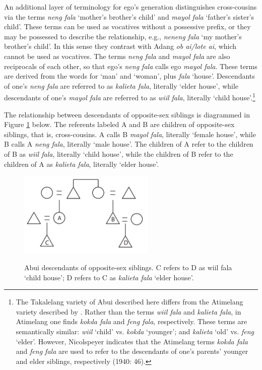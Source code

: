 An additional layer of terminology for ego's generation distinguishes cross-cousins via the terms \textit{neng fala} `mother's brother's child' and \textit{mayol fala} `father's sister's child'. These terms can be used as vocatives without a possessive prefix, or they may be possessed to describe the relationship, e.g., \textit{neneng fala} `my mother's brother's child'. In this sense they contrast with Adang \textit{ob ai/lote ai}, which cannot be used as vocatives. The terms \textit{neng fala} and \textit{mayol fala} are also reciprocals of each other, so that ego's \textit{neng fala} calls ego \textit{mayol fala}. These terms are derived from the words for `man' and `woman', plus \textit{fala} `house'. Descendants of one's \textit{neng fala} are referred to as \textit{kalieta fala}, literally `elder house', while descendants of one's \textit{mayol fala} are referred to as \textit{wiil fala}, literally `child house'.\footnote{{ }  The Takalelang variety of Abui described here differs from the Atimelang variety described by \citet{Nicolspeyer1940}. Rather than the terms \textit{wiil fala} and \textit{kalieta fala}, in Atimelang one finds \textit{kokda fala} and \textit{feng fala}, respectively. These terms are semantically similar: \textit{wiil} `child' vs. \textit{kokda} `younger'; and \textit{kalieta} `old' vs. \textit{feng} `elder'. However, Nicolspeyer indicates that the Atimelang terms \textit{kokda fala} and \textit{feng fala} are used to refer to the descendants of one's parents' younger and elder siblings, respectively (1940: 46).}  

The relationship between descendants of opposite-sex siblings is diagrammed in Figure \ref{fig11} below. The referents labeled A and B are children of opposite-sex siblings, that is, cross-cousins. A calls B \textit{mayol fala}, literally `female house', while B calls A \textit{neng fala}, literally `male house'. The children of A refer to the children of B as \textit{wiil fala}, literally `child house', while the children of B refer to the children of A as \textit{kalieta fala}, literally `elder house'. 

\begin{figure}\centering
\includegraphics[width=6.5cm]{figures/Holton_ch5_fig11.pdf}
\label{fig11}
\caption{Abui descendants of opposite-sex siblings. C refers to D as wiil fala `child house'; D refers to C as \textit{kalieta fala} `elder house'.}
\end{figure}  

